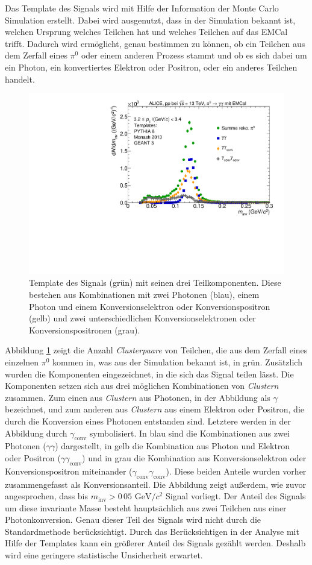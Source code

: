 Das Template des Signals wird mit Hilfe der Information der Monte Carlo Simulation erstellt.
Dabei wird ausgenutzt, dass in der Simulation bekannt ist, welchen Ursprung welches Teilchen hat und welches Teilchen auf das EMCal trifft.
Dadurch wird ermöglicht, genau bestimmen zu können, ob ein Teilchen aus dem Zerfall eines $\pi^{0}$ oder einem anderen Prozess stammt und ob es sich dabei um ein Photon, ein konvertiertes Elektron oder Positron, oder ein anderes Teilchen handelt.
\begin{figure}[tp]
\centering
\includegraphics[width=.75\linewidth]{PeakTemplateMotivation10_Data_2016.pdf}
\caption{Template des Signals (grün) mit seinen drei Teilkomponenten.
Diese bestehen aus Kombinationen mit zwei Photonen (blau), einem Photon und einem Konversionselektron oder Konversionspositron (gelb) und zwei unterschiedlichen Konversionselektronen oder Konversionspositronen (grau).}
\label{fig:SigTemp}
\end{figure}
\newline
Abbildung \ref{fig:SigTemp} zeigt die Anzahl \textit{Clusterpaare} von Teilchen, die aus dem Zerfall eines einzelnen $\pi^{0}$ kommen in, was aus der Simulation bekannt ist, in grün. 
Zusätzlich wurden die Komponenten eingezeichnet, in die sich das Signal teilen lässt.
Die Komponenten setzen sich aus drei möglichen Kombinationen von \textit{Clustern} zusammen.
Zum einen aus \textit{Clustern} aus Photonen, in der Abbildung als $\gamma$ bezeichnet, und zum anderen aus \textit{Clustern} aus einem Elektron oder Positron, die durch die Konversion  eines Photonen entstanden sind.
Letztere werden in der Abbildung durch $\gamma_\text{conv}$ symbolisiert.
\newline
In blau sind die Kombinationen aus zwei Photonen ($\gamma\gamma$) dargestellt, in gelb die Kombination aus Photon und Elektron oder Positron ($\gamma\gamma_\text{conv}$) und in grau die Kombination aus Konversionselektron oder Konversionspositron miteinander ($\gamma_\text{conv}\gamma_\text{conv}$).
Diese beiden Anteile wurden vorher zusammengefasst als Konversionsanteil.
\newline
Die Abbildung zeigt außerdem, wie zuvor angesprochen, dass bis $m_\text{inv}>0\,05 \text{ GeV}/c^{2}$ Signal vorliegt.
Der Anteil des Signals um diese invariante Masse besteht hauptsächlich aus zwei Teilchen aus einer Photonkonversion.
Genau dieser Teil des Signals wird nicht durch die Standardmethode berücksichtigt.
Durch das Berücksichtigen in der Analyse mit Hilfe der Templates kann ein größerer Anteil des Signals gezählt werden.
Deshalb wird eine geringere statistische Unsicherheit erwartet.
